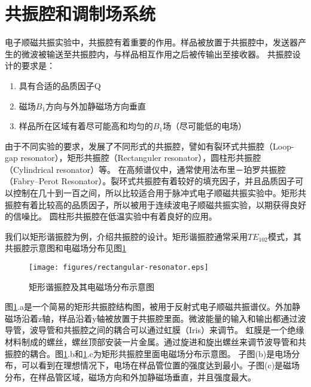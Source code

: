     \section{共振腔和调制场系统}
        电子顺磁共振实验中，共振腔有着重要的作用。样品被放置于共振腔中，发送器产生的微波被输送至共振腔内，与样品相互作用之后被传输出至接收器。
        共振腔设计的要求是：
            \begin{enumerate}
              \item 具有合适的品质因子Q
              \item 磁场$B_1$方向与外加静磁场方向垂直
              \item 样品所在区域有着尽可能高和均匀的$B_1$场（尽可能低的电场）
            \end{enumerate}
        由于不同实验的要求，发展了不同形式的共振腔，譬如有裂环式共振腔（Loop-gap resonator），矩形共振腔（Rectanguler resonator），圆柱形共振腔（Cylindrical resonator）等。 在高频谱仪中，通常使用法布里－珀罗共振腔（Fabry–Perot Resonator）。裂环式共振腔有着较好的填充因子，并且品质因子可以控制在几十到一百之间，所以比较适合用于脉冲式电子顺磁共振实验中。矩形共振腔有着比较高的品质因子，所以被用于连续波电子顺磁共振实验，以期获得良好的信噪比。
        圆柱形共振腔在低温实验中有着良好的应用。
        
        
        我们以矩形谐振腔为例，介绍共振腔的设计。矩形谐振腔通常采用$TE_{102}$模式，其共振腔示意图和电磁场分布见图\ref{rectangular-resonator}
            \begin{figure}[htbp]
                \begin{center}
                    \texttt{[image: figures/rectangular-resonator.eps]}
                    \caption{矩形谐振腔及其电磁场分布示意图\cite{Weil1}
                    }
                    \label{rectangular-resonator}
                \end{center}
            \end{figure}
        图\ref{rectangular-resonator}.a是一个简易的矩形共振腔结构图，被用于反射式电子顺磁共振谱仪。外加静磁场沿着z轴，样品沿着y轴被放置于共振腔里面。微波能量的输入和输出都通过波导管，波导管和共振腔之间的耦合可以通过虹膜（Iris）来调节。
        虹膜是一个绝缘材料制成的螺丝，螺丝顶部安装一片金属。通过旋进和旋出螺丝来调节波导管和共振腔的耦合。图\ref{rectangular-resonator}.b和\ref{rectangular-resonator}.c为矩形共振腔里面电磁场分布示意图。
        子图(b)是电场分布，可以看到在理想情况下，电场在样品管位置的强度达到最小。子图(c)是磁场分布，在样品管区域，磁场方向和外加静磁场垂直，并且强度最大。
        
